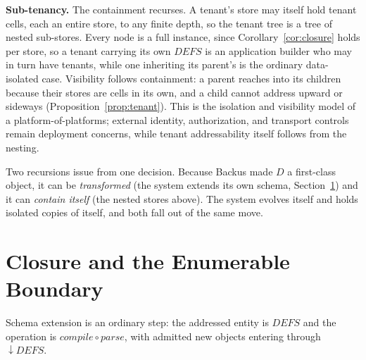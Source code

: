 \documentclass[10pt,twocolumn]{article}
\theoremstyle{plain}
\theoremstyle{definition}
\begin{document}
\smallskip\noindent\textbf{Sub-tenancy.} The containment recurses. A tenant's store may itself hold tenant cells, each an entire store, to any finite depth, so the tenant tree is a tree of nested sub-stores. Every node is a full instance, since Corollary~\ref{cor:closure} holds per store, so a tenant carrying its own $\mathit{DEFS}$ is an application builder who may in turn have tenants, while one inheriting its parent's is the ordinary data-isolated case. Visibility follows containment: a parent reaches into its children because their stores are cells in its own, and a child cannot address upward or sideways (Proposition~\ref{prop:tenant}). This is the isolation and visibility model of a platform-of-platforms; external identity, authorization, and transport controls remain deployment concerns, while tenant addressability itself follows from the nesting.

Two recursions issue from one decision. Because Backus made $D$ a first-class object, it can be \emph{transformed} (the system extends its own schema, Section~\ref{sec:boundary}) and it can \emph{contain itself} (the nested stores above). The system evolves itself and holds isolated copies of itself, and both fall out of the same move.


\section{Closure and the Enumerable Boundary}\label{sec:boundary}

Schema extension is an ordinary step: the addressed entity is $\mathit{DEFS}$ and the operation is $\mathit{compile}\circ\mathit{parse}$, with admitted new objects entering through $\downarrow\!\mathit{DEFS}$.
\end{document}
